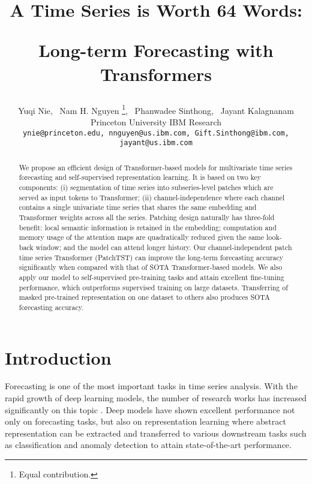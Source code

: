 \documentclass{article} \usepackage{iclr2023_conference,times}
\title{
A Time Series is Worth 64 Words:

Long-term Forecasting with Transformers









}
\author{Yuqi Nie\footnotemark[1], \ Nam H. Nguyen \thanks{Equal contribution.}, \ Phanwadee Sinthong, \ Jayant Kalagnanam \\
Princeton University IBM Research\\
\texttt{ynie@princeton.edu, nnguyen@us.ibm.com, Gift.Sinthong@ibm.com,} \\
\texttt{jayant@us.ibm.com} \\
}
\begin{document}
\maketitle

\begin{abstract}





We propose an efficient design of Transformer-based models for multivariate time series forecasting and self-supervised representation learning. It is based on two key components: (i) segmentation of time series into subseries-level patches which are served as input tokens to Transformer; (ii) channel-independence where each channel contains a single univariate time series that shares the same embedding and Transformer weights across all the series. Patching design naturally has three-fold benefit: local semantic information is retained in the embedding; computation and memory usage of the attention maps are quadratically reduced given the same look-back window; and the model can attend longer history. Our channel-independent patch time series Transformer (PatchTST) can improve the long-term forecasting accuracy significantly when compared with that of SOTA Transformer-based models. We also apply our model to self-supervised pre-training tasks and attain excellent fine-tuning performance, which outperforms supervised training on large datasets. Transferring of masked pre-trained representation on one dataset to others also produces SOTA forecasting accuracy.



\end{abstract}

\section{Introduction}

Forecasting is one of the most important tasks in time series analysis. With the rapid growth of deep learning models, the number of research works has increased significantly on this topic \citep{survey1,survey2,survey3}. Deep models have shown excellent performance not only on forecasting tasks, but also on representation learning where abstract representation can be extracted and transferred to various downstream tasks such as classification and anomaly detection to attain state-of-the-art performance.
\end{document}

